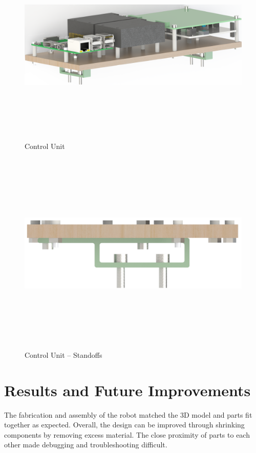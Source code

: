\begin{figure}[H]   %
	\centering \includegraphics[width=6in, height=3.85in, keepaspectratio]{figures/control_unit.png}
	\caption{Control Unit}	\label{fig:control_unit}
\end{figure}

\begin{figure}[H]   %
	\centering \includegraphics[width=6in, height=3.85in, keepaspectratio]{figures/control_unit_standoffs.png}
	\caption{Control Unit -- Standoffs}	\label{fig:control_unit_standoffs}
\end{figure}

\section{Results and Future Improvements}
The fabrication and assembly of the robot matched the 3D model and parts fit together as expected. Overall, the design can be improved through shrinking components by removing excess material. The close proximity of parts to each other made debugging and troubleshooting difficult.

